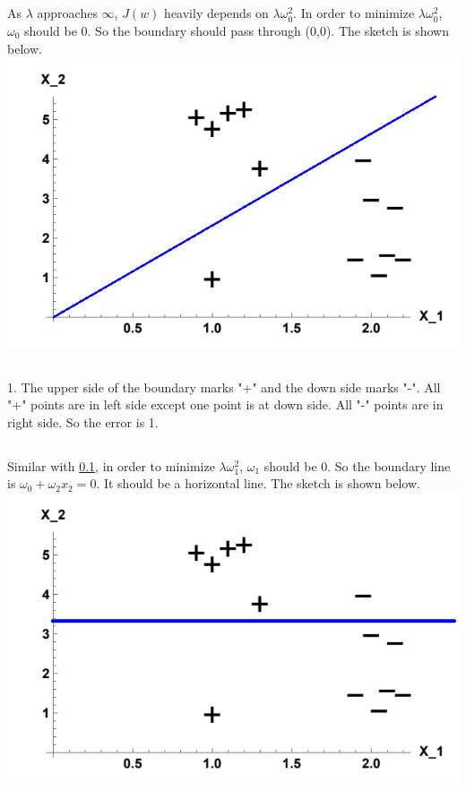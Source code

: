 \documentclass{article}
\begin{document}
\subsection{}
\label{sec:2d}
As $\lambda$ approaches $\infty$, $J(w)$ heavily depends on $\lambda\omega_0^2$. In order to minimize $\lambda\omega_0^2$, $\omega_0$ should be 0. So the boundary should pass through (0,0). The sketch is shown below.\\
\includegraphics{2d.png}
\subsection{}
1. The upper side of the boundary marks "+" and the down side marks "-". All "+" points are in left side except one point is at down side. All "-" points are in right side. So the error is 1.
\subsection{}
Similar with \ref{sec:2d}, in order to minimize $\lambda\omega_1^2$, $\omega_1$ should be 0. So the boundary line is $\omega_0 + \omega_2x_2 = 0$. It should be a horizontal line. The sketch is shown below.\\
\includegraphics{2f.png}
\end{document}
